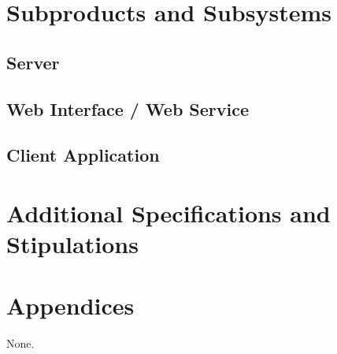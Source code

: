 \documentclass[11pt,a4paper,oneside,svgnames,draft]{report}
\begin{document}
\chapter{Subproducts and Subsystems}
\section{Server}
\section{Web Interface / Web Service}
\section{Client Application}

\chapter{Additional Specifications and Stipulations}
\chapter{Appendices}
None.
\end{document}
